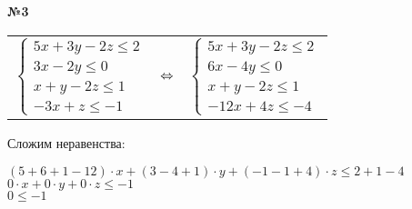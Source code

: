 \documentclass{article}
\newenvironment{task}{\begin{center}\fontsize{14}{14}\selectfont\bf}{\rm\fontsize{12}{12}\selectfont\end{center}}
\begin{document}

	\begin{task} 
	№3
	\end{task}
	\begin{center}
	\begin{tabular}{ccc}
		$\begin{cases}
		5x+3y-2z \leq 2 \\
		3x-2y \leq 0 \\
		x+y-2z \leq 1 \\
		-3x+z \leq -1
		\end{cases}$
		& $\hfill \Leftrightarrow \hfill$ &
		$\begin{cases}
		5x+3y-2z \leq 2 \\
		6x-4y \leq 0 \\
		x+y-2z \leq 1 \\
		-12x+4z \leq -4
		\end{cases}$
	\end{tabular}
	\end{center}
	Сложим неравенства:
	\begin{center}
		$(5+6+1-12)\cdot x + (3-4+1)\cdot y + (-1-1+4)\cdot z \leq 2+1-4$ \\
		$0\cdot x + 0\cdot y + 0\cdot z \leq -1$ \\
		$0 \leq -1$
	\end{center}

\end{document}
